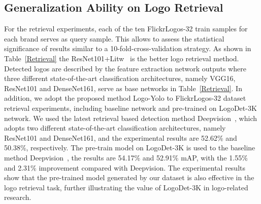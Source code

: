 \documentclass[journal]{IEEEtran}
\begin{document}
\subsection{Generalization Ability on Logo Retrieval}
For the retrieval experiments, each of the ten FlickrLogos-32 train samples for each brand serves as query sample. This allows to assess the statistical significance of results similar to a 10-fold-cross-validation strategy. As shown in Table~\ref{Retrieval} the ResNet101+Litw~\cite{Andras2017Open} is the better logo retrieval method. Detected logos are described by the feature extraction network outputs where three different state-of-the-art classification architectures, namely VGG16, ResNet101 and DenseNet161, serve as base networks in Table~\ref{Retrieval}. In addition, we adopt the proposed method Logo-Yolo to FlickrLogos-32 dataset retrieval experiments, including baseline network and pre-trained on LogoDet-3K network. We used the latest retrieval based detection method Deepvision~\cite{II2019Scalable}, which adopts two different state-of-the-art classification architectures, namely ResNet101 and DenseNet161, and the experimental results are 52.62\% and 50.38\%, respectively. The pre-train model on LogoDet-3K is used to the baseline method Deepvision~\cite{II2019Scalable}, the results are 54.17\% and 52.91\% mAP, with the 1.55\% and 2.31\% improvement compared with Deepvision. The experimental results show that the pre-trained model generated by our dataset is also effective in the logo retrieval task, further illustrating the value of LogoDet-3K in logo-related research.
\end{document}
